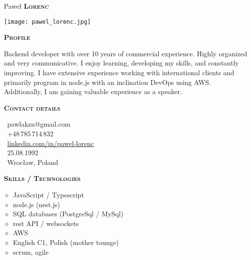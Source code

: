 \documentclass[11pt, a4paper]{article}
\newcommand{\smaller}[1]{{\small$\diamond$\ #1}}
\newcommand{\headleft}[1]{\vspace*{3ex}\textsc{\textbf{#1}}\par%
    \vspace*{-1.5ex}\hrulefill\par\vspace*{0.7ex}}
\begin{document}
\setlength{\topskip}{0pt}
\setlength{\parindent}{0pt}
\setlength{\parskip}{0pt}
\setlength{\fboxsep}{0pt}
\pagestyle{empty}
\raggedbottom

\begin{minipage}[t]{0.33\textwidth} %
\colorbox{cvblue}{\begin{minipage}[t][5mm][t]
{\textwidth}\null\hfill\null\end{minipage}}

\vspace{-.2ex} %
\colorbox{cvblue!90}{\color{white}  %
\textwidth\relax%
\begin{minipage}[t][293mm][t]{0.82\textwidth}
\raggedright
\vspace*{2.5ex}

{\centering \Large Paweł \textbf{\textsc{Lorenc}} \normalsize\par}

\null\hfill\texttt{[image: pawel\_lorenc.jpg]}\hfill\null

\vspace*{0.5ex} %

\headleft{Profile}
Backend developer with over 10 years of commercial experience. Highly organized and very communicative. I enjoy learning, developing my skills, and constantly improving. I have extensive experience working with international clients and primarily program in node.js with an inclination DevOps using AWS. Additionally, I am gaining valuable experience as a speaker.

\headleft{Contact details}
\small %
\MVAt\ {\small pawlakzn@gmail.com} \\[0.4ex]
\Mobilefone\ +48\,785\,714\,832 \\[0.5ex]
\faLinkedin\ \href{https://www.linkedin.com/in/pawel-lorenc/}{linkedin.com/in/pawel-lorenc} \\[0.1ex]
\faBirthdayCake\ 25.08.1992 \\[0.4ex]
\faHome\ Wrocław, Poland
\normalsize

\headleft{Skills / Technologies}
\smaller{JavaScript / Typescript} \\
\smaller{node.js (nest.js)} \\
\smaller{SQL databases (PostgreSql / MySql)} \\
\smaller{rest API / websockets} \\
\smaller{AWS} \\
\smaller{English C1, Polish (mother tounge)} \\
\smaller{scrum, agile} \\


\end{minipage}}
\end{minipage}
\end{document}
